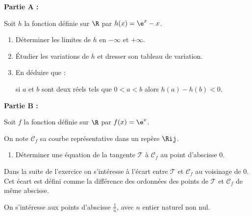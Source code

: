 \textbf{Partie A :}

\medskip

Soit $h$ la fonction définie sur $\R$ par $h(x) = \e^x-x$.

\begin{enumerate}
	\item Déterminer les limites de $h$ en $-\infty$ et $+\infty$.
	\item Étudier les variations de $h$ et dresser son tableau de variation.
	\item En déduire que :
	
	si $a$ et $b$ sont deux réels tels que $0 < a < b$ alors $h(a)-h(b) < 0$.
\end{enumerate}

\textbf{Partie B :}

\medskip

Soit $f$ la fonction définie sur $\R$ par $f(x) = \e^x$.

On note $\mathcal{C}_f$ sa courbe représentative dans un repère $\Rij$.

\begin{enumerate}
	\item Déterminer une équation de la tangente $\mathcal{T}$ à $\mathcal{C}_f$ au point d’abscisse 0.
\end{enumerate}

Dans la suite de l’exercice on s’intéresse à l’écart entre $\mathcal{T}$ et $\mathcal{C}_f$ au voisinage de 0. Cet écart est défini comme la différence des ordonnées des points de $\mathcal{T}$ et $\mathcal{C}_f$ de même abscisse.

\smallskip

On s’intéresse aux points d’abscisse $\frac{1}{n}$, avec $n$ entier naturel non nul.


